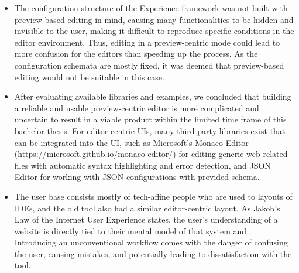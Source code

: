 \begin{itemize}
  \item The configuration structure of the Experience framework was not built with preview-based editing in mind, causing many functionalities to be hidden and invisible to the user, making it difficult to reproduce specific conditions in the editor environment.
  Thus, editing in a preview-centric mode could lead to more confusion for the editors than speeding up the process.
  As the configuration schemata are mostly fixed, it was deemed that preview-based editing would not be suitable in this case.
  \item After evaluating available libraries and examples, we concluded that building a reliable and usable preview-centric editor is more complicated and uncertain to result in a viable product within the limited time frame of this bachelor thesis.
  For editor-centric UIs, many third-party libraries exist that can be integrated into the UI, such as Microsoft's Monaco Editor (\url{https://microsoft.github.io/monaco-editor/}) for editing generic web-related files with automatic syntax highlighting and error detection, and JSON Editor for working with JSON configurations with provided schema.
  \item The user base consists mostly of tech-affine people who are used to layouts of IDEs, and the old tool also had a similar editor-centric layout.
  As Jakob's Law of the Internet User Experience states, the user's understanding of a website is directly tied to their mental model of that system \cite{Nielsen:2000} and \cite[p. 2]{LawsOfUX:2020ys}. Introducing an unconventional workflow comes with the danger of confusing the user, causing mistakes, and potentially leading to dissatisfaction with the tool.
 
\end{itemize}

